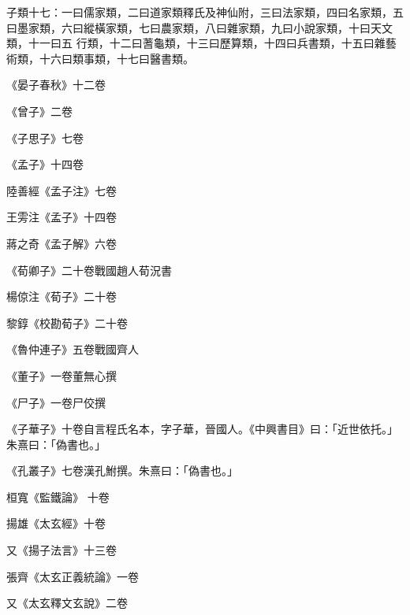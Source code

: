 
\begin{pinyinscope}

 子類十七：一曰儒家類，二曰道家類釋氏及神仙附，三曰法家類，四曰名家類，五曰墨家類，六曰縱橫家類，七曰農家類，八曰雜家類，九曰小說家類，十曰天文類，十一曰五
 行類，十二曰蓍龜類，十三曰歷算類，十四曰兵書類，十五曰雜藝術類，十六曰類事類，十七曰醫書類。



 《晏子春秋》十二卷



 《曾子》二卷



 《子思子》七卷



 《孟子》十四卷



 陸善經《孟子注》七卷



 王雱注《孟子》十四卷



 蔣之奇《孟子解》六卷



 《荀卿子》二十卷戰國趙人荀況書



 楊倞注《荀子》二十卷



 黎錞《校勘荀子》二十卷



 《魯仲連子》五卷戰國齊人



 《董子》一卷董無心撰



 《尸子》一卷尸佼撰



 《子華子》十卷自言程氏名本，字子華，晉國人。《中興書目》曰：「近世依托。」朱熹曰：「偽書也。」



 《孔叢子》七卷漢孔鮒撰。朱熹曰：「偽書也。」



 桓寬《監鐵論》
 十卷



 揚雄《太玄經》十卷



 又《揚子法言》十三卷



 張齊《太玄正義統論》一卷



 又《太玄釋文玄說》二卷




\end{pinyinscope}
